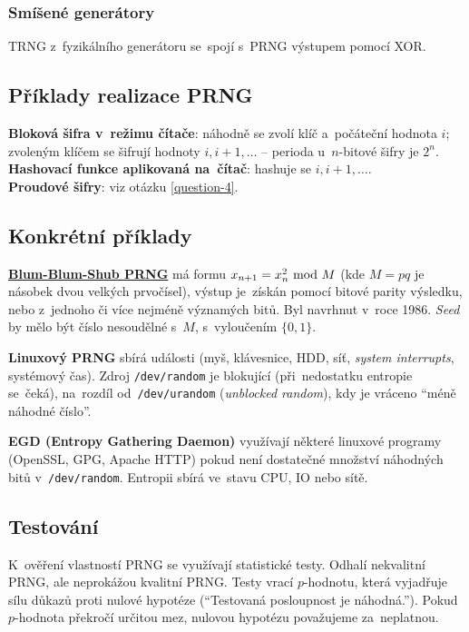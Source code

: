 \subsubsection*{Smíšené generátory}

TRNG z~fyzikálního generátoru se~spojí s~PRNG výstupem pomocí XOR.

\subsection{Příklady realizace PRNG}

\textbf{Bloková šifra v~režimu čítače}: náhodně se zvolí klíč a~počáteční hodnota $i$; zvoleným klíčem se šifrují hodnoty $i, i+1, \dots$ -- perioda u~$n$-bitové šifry je $2^n$. \\
\textbf{Hashovací funkce aplikovaná na~čítač}: hashuje se $i, i+1, \dots$. \\
\textbf{Proudové šifry}: viz otázku \ref{question-4}.

\subsection{Konkrétní příklady}

\textbf{\href{https://en.wikipedia.org/wiki/Blum_Blum_Shub}{Blum-Blum-Shub PRNG}} má formu $x_{n+1} = x_n^2 \ \mathrm{mod}\ M$ (kde $M = pq$ je násobek dvou velkých prvočísel), výstup je~získán pomocí bitové parity výsledku, nebo z~jednoho či více nejméně významých bitů. Byl navrhnut v~roce 1986. \emph{Seed} by mělo být číslo nesoudělné s~$M$, s~vyloučením $\{0, 1\}$.

\textbf{Linuxový PRNG} sbírá události (myš, klávesnice, HDD, síť, \emph{system interrupts}, systémový čas). Zdroj \texttt{/dev/random} je blokující (při~nedostatku entropie se~čeká), na~rozdíl od~\texttt{/dev/urandom} (\emph{unblocked random}), kdy je vráceno \enquote{méně náhodné číslo}.

\textbf{EGD (Entropy Gathering Daemon)} využívají některé linuxové programy (OpenSSL, GPG, Apache HTTP) pokud není dostatečné množství náhodných bitů v~\texttt{/dev/random}. Entropii sbírá ve~stavu CPU, IO nebo sítě.

\subsection{Testování}

K~ověření vlastností PRNG se využívají statistické testy. Odhalí nekvalitní PRNG, ale neprokážou kvalitní PRNG. Testy vrací $p$-hodnotu, která vyjadřuje sílu důkazů proti nulové hypotéze (\enquote{Testovaná posloupnost je náhodná.}). Pokud $p$-hodnota překročí určitou mez, nulovou hypotézu považujeme za~neplatnou.


